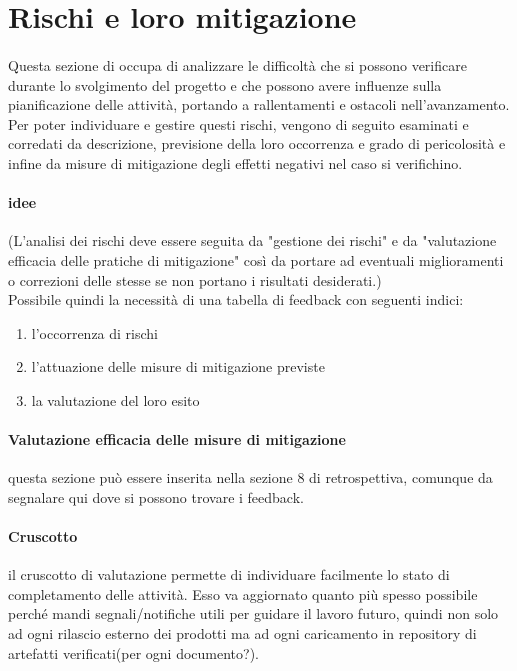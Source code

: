 \documentclass[10pt, a4paper]{article}
\begin{document}
\section{Rischi e loro mitigazione}
\paragraph{}Questa sezione di occupa di analizzare le difficoltà che si possono verificare durante lo svolgimento del progetto e che possono avere influenze sulla pianificazione delle attività, portando a rallentamenti e ostacoli nell'avanzamento.\\
Per poter individuare e gestire questi rischi, vengono di seguito esaminati e corredati da descrizione, previsione della loro occorrenza e grado di pericolosità e infine da misure di mitigazione degli effetti negativi nel caso si verifichino.

\color{gray}\paragraph{ idee} (L'analisi dei rischi deve essere seguita da "gestione dei rischi" e da "valutazione efficacia delle pratiche di mitigazione" così da portare ad eventuali miglioramenti o correzioni delle stesse se non portano i risultati desiderati.)\\
Possibile quindi la necessità di una tabella di feedback con seguenti indici:
\begin{enumerate}
    \item l’occorrenza di rischi
    \item l’attuazione delle misure di mitigazione previste
    \item la valutazione del loro esito
\end{enumerate}
   
\paragraph{Valutazione efficacia delle misure di mitigazione} questa sezione può essere inserita nella sezione 8 di retrospettiva, comunque da segnalare qui dove si possono trovare i feedback.
\paragraph{Cruscotto} il cruscotto di valutazione permette di individuare
facilmente lo stato di completamento delle attività. Esso va aggiornato quanto più spesso possibile perché mandi segnali/notifiche utili per guidare il lavoro futuro, quindi non solo ad ogni rilascio esterno dei prodotti ma ad ogni caricamento in repository di artefatti verificati(per ogni documento?).\\
\color{black}
\end{document}
